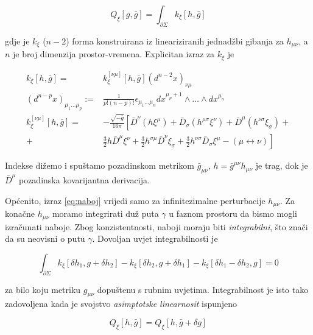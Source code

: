 \begin{enumerate}
\begin{equation}
Q_\xi[g,\bar{g}]=\int_{\partial\Sigma}k_\xi[h,\bar{g}]
\label{eq:naboj}
\end{equation}

\noindent gdje je $k_\xi$ ($n-2$) forma konstruirana iz lineariziranih jednadžbi gibanja za $h_{\mu\nu}$, a $n$ je broj dimenzija prostor-vremena.
Explicitan izraz za $k_\xi$ je

\begin{equation}
\begin{split}
k_\xi[h,\bar{g}]=&k^{[\nu\mu]}_\xi[h,\bar{g}](d^{n-2}x)_{\nu\mu}\\[2.5mm]
(d^{n-p}x)_{\mu_1\ldots\mu_p}:=&\frac{1}{p!(n-p)!}\epsilon_{\mu_1\ldots\mu_n}dx^{\mu_p+1}\wedge\ldots\wedge dx^{\mu_n}\\[2.5mm]
k_\xi^{[\nu\mu]}[h,\bar{g}]=&-\frac{\sqrt{-\bar{g}}}{16\pi}\left[\bar{D}^\nu(h\xi^\mu)+\bar{D}_\sigma(h^{\mu\sigma}\xi^\nu)+\bar{D}^\mu(h^{\nu\sigma}\xi_\sigma)+\right.\\[2mm]
+&\frac{3}{2}h\bar{D}^\mu\xi^\nu+\frac{3}{2}h^{\sigma\mu}\bar{D}^\nu\xi_\sigma+\frac{3}{2}h^{\nu\sigma}\bar{D}_\sigma\xi^\mu-(\mu\leftrightarrow\nu)\left.\right]
\end{split}
\label{eq:superpot}
\end{equation}



\noindent Indekse dižemo i spuštamo pozadinskom metrikom $\bar{g}_{\mu\nu}$, $h=\bar{g}^{\mu\nu}h_{\mu\nu}$ je trag, dok je $\bar{D}^\mu$ pozadinska kovarijantna derivacija.

Općenito, izraz \eqref{eq:naboj} vrijedi samo za infinitezimalne perturbacije $h_{\mu\nu}$. Za konačne $h_{\mu\nu}$ moramo integrirati duž puta $\gamma$ u faznom prostoru da bismo mogli izračunati naboje. Zbog konzistentnosti, naboji moraju biti \textit{integrabilni}, što znači da su neovisni o putu $\gamma$. Dovoljan uvjet integrabilnosti je 

\begin{equation*}
\int_{\partial\Sigma}k_\xi[\delta h_1,g+\delta h_2]-k_\xi[\delta h_2,g+\delta h_1]-k_\xi[\delta h_1-\delta h_2,g]=0
\end{equation*}

za bilo koju metriku $g_{\mu\nu}$ dopuštenu s rubnim uvjetima. Integrabilnost je isto tako zadovoljena kada je svojstvo \textit{asimptotske linearnosit} ispunjeno

\begin{equation*}
Q_\xi[h,\bar{g}]=Q_\xi[h,\bar{g}+\delta g]
\end{equation*}


\end{enumerate}
